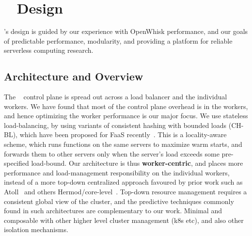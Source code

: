 \section{\sysname~ Design}
\label{sec:design}


\sysname's design is guided by our experience with OpenWhisk performance, and our goals of predictable performance, modularity, and providing a platform for reliable serverless computing research.

\subsection{Architecture and Overview}

The \sysname~ control plane is spread out across a load balancer and the individual workers.
We have found that most of the control plane overhead is in the workers, and hence optimizing the worker performance is our major focus.
We use stateless load-balancing, by using variants of consistent hashing with bounded loads (CH-BL), which have been proposed for FaaS recently~\cite{fuerst-hpdc23}.
This is a locality-aware scheme, which runs functions on the same servers to maximize warm starts, and forwards them to other servers only when the server's load exceeds some pre-specified load-bound.
Our architecture is thus \textbf{worker-centric}, and places more performance and load-management responsibility on the individual workers, instead of a more top-down centralized approach favoured by prior work such as Atoll~\cite{} and others Hermod/core-level~\cite{}. 
Top-down resource management requires a consistent global view of the cluster, and the predictive techniques commonly found in such architectures are complementary to our work.
Minimal and composable with other higher level cluster management (k8s etc), and also other isolation mechanisms.


